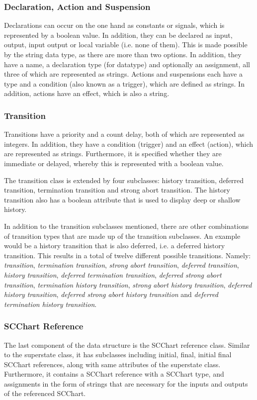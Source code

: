 \subsubsection{Declaration, Action and Suspension}
Declarations can occur on the one hand as constants or signals, which is represented by a boolean value. In addition, they can be declared as input, output, input output or local variable (i.e. none of them). This is made possible by the string data type, as there are more than two options. In addition, they have a name, a declaration type (for datatype) and optionally an assignment, all three of which are represented as strings. Actions and suspensions each have a type and a condition (also known as a trigger), which are defined as strings. In addition, actions have an effect, which is also a string.
\subsubsection{Transition}
Transitions have a priority and a count delay, both of which are represented as integers. In addition, they have a condition (trigger) and an effect (action), which are represented as strings. Furthermore, it is specified whether they are immediate or delayed, whereby this is represented with a boolean value.

The transition class is extended by four subclasses: history transition, deferred transition, termination transition and strong abort transition. The history transition also has a boolean attribute that is used to display deep or shallow history.

In addition to the transition subclasses mentioned, there are other combinations of transition types that are made up of the transition subclasses. An example would be a history transition that is also deferred, i.e. a deferred history transition. This results in a total of twelve different possible transitions. Namely: \textit{transition}, \textit{termination transition}, \textit{strong abort transition}, \textit{deferred transition}, \textit{history transition}, \textit{deferred termination transition}, \textit{deferred strong abort transition}, \textit{termination history transition}, \textit{strong abort history transition}, \textit{deferred history transition}, \textit{deferred strong abort history transition} and \textit{deferred termination history transition}.
\subsubsection{SCChart Reference}
The last component of the data structure is the SCChart reference class. Similar to the superstate class, it has subclasses including initial, final, initial final SCChart references, along with same attributes of the superstate class. Furthermore, it contains a SCChart reference with a SCChart type, and assignments in the form of strings that are necessary for the inputs and outputs of the referenced SCChart.

